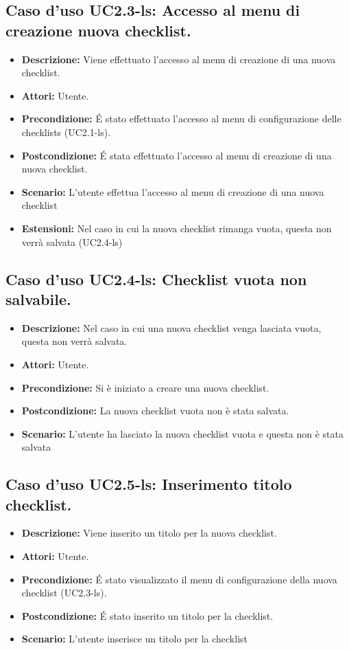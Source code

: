 \subsection{Caso d'uso UC2.3-ls: Accesso al menu di creazione nuova checklist.}
\begin{itemize}
\item[]\textbf{Descrizione:} Viene effettuato l'accesso al menu di creazione di una nuova checklist.
\item[]\textbf{Attori:} Utente. 
\item[]\textbf{Precondizione:} \'E stato effettuato l'accesso al menu di configurazione delle checklists (UC2.1-ls). 
\item[]\textbf{Postcondizione:} \'E stata effettuato l'accesso al menu di creazione di una nuova checklist. 
\item[]\textbf{Scenario:}
L'utente effettua l'accesso al menu di creazione di una nuova checklist 
\item[]\textbf{Estensioni:}
Nel caso in cui la nuova checklist rimanga vuota, questa non verrà salvata (UC2.4-ls) 
\end{itemize}

\subsection{Caso d'uso UC2.4-ls: Checklist vuota non salvabile.}
\begin{itemize}
\item[]\textbf{Descrizione:} Nel caso in cui una nuova checklist venga lasciata vuota, questa non verrà salvata.
\item[]\textbf{Attori:} Utente. 
\item[]\textbf{Precondizione:} Si è iniziato a creare una nuova checklist. 
\item[]\textbf{Postcondizione:} La nuova checklist vuota non è stata salvata. 
\item[]\textbf{Scenario:}
L'utente ha lasciato la nuova checklist vuota e questa non è stata salvata 
\end{itemize}

\subsection{Caso d'uso UC2.5-ls: Inserimento titolo checklist.}
\begin{itemize}
\item[]\textbf{Descrizione:} Viene inserito un titolo per la nuova checklist.
\item[]\textbf{Attori:} Utente. 
\item[]\textbf{Precondizione:} \'E stato visualizzato il menu di configurazione della nuova checklist (UC2.3-ls). 
\item[]\textbf{Postcondizione:} \'E stato inserito un titolo per la checklist. 
\item[]\textbf{Scenario:}
L'utente inserisce un titolo per la checklist 
\end{itemize}

